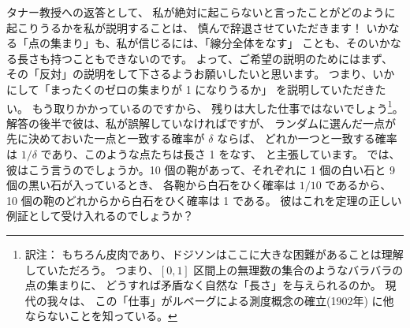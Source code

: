 \documentclass{article}
\begin{document}
タナー教授への返答として、
私が絶対に起こらないと言ったことがどのように起こりうるかを私が説明することは、
慎んで辞退させていただきます！
いかなる「点の集まり」も、私が信じるには、「線分全体をなす」
ことも、そのいかなる長さも持つこともできないのです。
よって、ご希望の説明のためにはまず、
その「反対」の説明をして下さるようお願いしたいと思います。
つまり、いかにして「まったくのゼロの集まりが 1 になりうるか」
を説明していただきたい。
もう取りかかっているのですから、
残りは大した仕事ではないでしょう\footnote{訳注：
もちろん皮肉であり、ドジソンはここに大きな困難があることは理解していただろう。
つまり、$[0, 1]$ 区間上の無理数の集合のようなバラバラの点の集まりに、
どうすれば矛盾なく自然な「長さ」を与えられるのか。
現代の我々は、
この「仕事」がルベーグによる測度概念の確立(1902年)
に他ならないことを知っている。}。
解答の後半で彼は、私が誤解していなければですが、
ランダムに選んだ一点が先に決めておいた一点と一致する確率が $\delta$ ならば、
どれか一つと一致する確率は $1/\delta$ であり、このような点たちは長さ 1 をなす、
と主張しています。
では、彼はこう言うのでしょうか。10 個の鞄があって、それぞれに
1 個の白い石と 9 個の黒い石が入っているとき、
各鞄から白石をひく確率は $1/10$ であるから、
10 個の鞄のどれからから白石をひく確率は 1 である。
彼はこれを定理の正しい例証として受け入れるのでしょうか？
\end{document}

